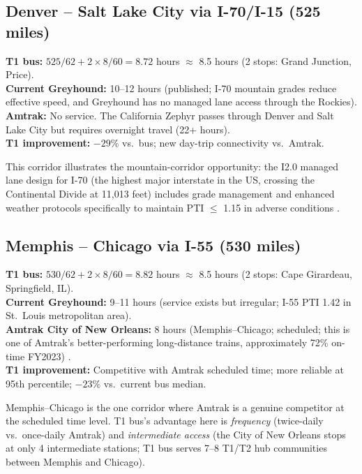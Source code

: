 \subsection{Denver -- Salt Lake City via I-70/I-15 (525 miles)}

\textbf{T1 bus:} $525 / 62 + 2 \times 8/60 = 8.72$ hours $\approx$ 8.5 hours (2 stops: Grand Junction, Price). \\
\textbf{Current Greyhound:} 10--12 hours (published; I-70 mountain grades reduce effective speed, and Greyhound has no managed lane access through the Rockies). \\
\textbf{Amtrak:} No service. The California Zephyr passes through Denver and Salt Lake City but requires overnight travel (22+ hours). \\
\textbf{T1 improvement:} $-29\%$ vs.\ bus; new day-trip connectivity vs.\ Amtrak.

This corridor illustrates the mountain-corridor opportunity: the I2.0 managed lane design for I-70 (the highest major interstate in the US, crossing the Continental Divide at 11,013 feet) includes grade management and enhanced weather protocols specifically to maintain PTI $\leq$ 1.15 in adverse conditions \citep{ROUTE_E1}.

\subsection{Memphis -- Chicago via I-55 (530 miles)}

\textbf{T1 bus:} $530 / 62 + 2 \times 8/60 = 8.82$ hours $\approx$ 8.5 hours (2 stops: Cape Girardeau, Springfield, IL). \\
\textbf{Current Greyhound:} 9--11 hours (service exists but irregular; I-55 PTI 1.42 in St.\ Louis metropolitan area). \\
\textbf{Amtrak City of New Orleans:} 8 hours (Memphis--Chicago; scheduled; this is one of Amtrak's better-performing long-distance trains, approximately 72\% on-time FY2023) \citep{Amtrak2023}. \\
\textbf{T1 improvement:} Competitive with Amtrak scheduled time; more reliable at 95th percentile; $-23\%$ vs.\ current bus median.

Memphis--Chicago is the one corridor where Amtrak is a genuine competitor at the scheduled time level. T1 bus's advantage here is \emph{frequency} (twice-daily vs.\ once-daily Amtrak) and \emph{intermediate access} (the City of New Orleans stops at only 4 intermediate stations; T1 bus serves 7--8 T1/T2 hub communities between Memphis and Chicago).

